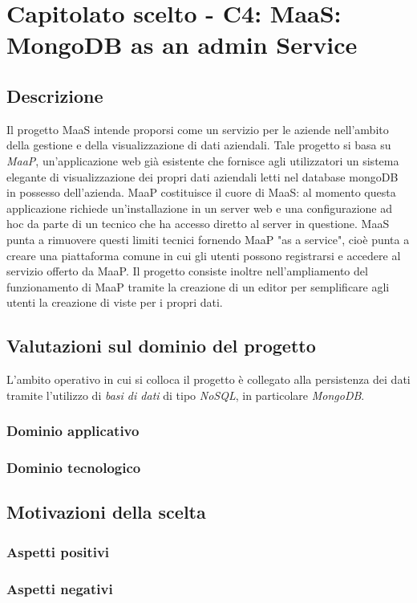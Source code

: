 \section{Capitolato scelto - C4: MaaS: MongoDB as an admin Service}
\subsection{Descrizione}
Il progetto MaaS intende proporsi come un servizio per le aziende nell'ambito della gestione e della visualizzazione di dati aziendali. 
Tale progetto si basa su \textit{MaaP}, un'applicazione web gi\`a esistente che fornisce agli utilizzatori un sistema elegante di visualizzazione
dei propri dati aziendali letti nel database mongoDB in possesso dell'azienda.
MaaP costituisce il cuore di MaaS: al momento questa applicazione richiede un'installazione in un server web e 
una configurazione ad hoc da parte di un tecnico che ha accesso diretto al server in questione. MaaS punta a rimuovere 
questi limiti tecnici fornendo MaaP "as a service", cioè punta a creare una piattaforma comune in cui gli utenti possono 
registrarsi e accedere al servizio offerto da MaaP. Il progetto consiste inoltre nell'ampliamento del funzionamento di MaaP tramite la creazione di 
un editor per semplificare agli utenti la creazione di viste per i propri dati.


\subsection{Valutazioni sul dominio del progetto}
L'ambito operativo in cui si colloca il progetto \`e collegato alla persistenza dei dati tramite l'utilizzo
di \textit{basi di dati} di tipo \textit{NoSQL}, in particolare \textit{MongoDB}.

\subsubsection{Dominio applicativo}

\subsubsection{Dominio tecnologico}
\begin{itemize}
\end{itemize}


\subsection{Motivazioni della scelta}
\subsubsection{Aspetti positivi}

\subsubsection{Aspetti negativi}

